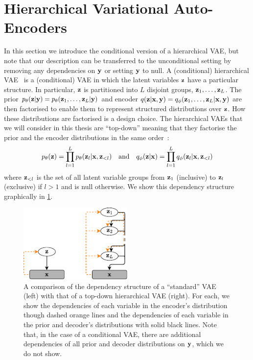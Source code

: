 \section{Hierarchical Variational Auto-Encoders} \label{sec:hierarchical-vae}
In this section we introduce the conditional version of a hierarchical VAE, but note that our description can be transferred to the unconditional setting by removing any dependencies on ${\mathbf{y}}$ or setting ${\mathbf{y}}$ to null. A (conditional) hierarchical VAE~\citep{gregor2015draw,kingma2016improving,sonderby2016ladder,klushyn2019learning} is a (conditional) VAE in which the latent variables ${\mathbf{z}}$ have a particular structure. In particular, ${\mathbf{z}}$ is partitioned into $L$ disjoint groups, ${\mathbf{z}}_1,\ldots,{\mathbf{z}}_L$. The prior $p_\theta({\mathbf{z}}|{\mathbf{y}}) = p_\theta({\mathbf{z}}_1,\ldots,{\mathbf{z}}_L|{\mathbf{y}})$ and encoder $q({\mathbf{z}}|{\mathbf{x}},{\mathbf{y}}) = q_\phi({\mathbf{z}}_1,\ldots,{\mathbf{z}}_L|{\mathbf{x}},{\mathbf{y}})$ are then factorised to enable them to represent structured distributions over ${\mathbf{z}}$. How these distributions are factorised is a design choice.
The hierarchical VAEs that we will consider in this thesis are ``top-down'' meaning that they factorise the prior and the encoder distributions in the same order~\citep{vahdat2020nvae,child2020very}:
\begin{equation}
    p_\theta({\mathbf{z}}) = \prod_{l=1}^L p_\theta({\mathbf{z}}_l|{\mathbf{x}},{\mathbf{z}}_{<l}) \quad \text{and} \quad q_\phi({\mathbf{z}}|{\mathbf{x}}) = \prod_{l=1}^L q_\phi({\mathbf{z}}_l|{\mathbf{x}},{\mathbf{z}}_{<l})
\end{equation}
where ${\mathbf{z}}_{<l}$ is the set of all latent variable groups from ${\mathbf{z}}_1$ (inclusive) to ${\mathbf{z}}_{l}$ (exclusive) if $l > 1$ and is null otherwise. We show this dependency structure graphically in \cref{fig:vae-vs-hierarchical-vae}.

\begin{figure}
    \centering
    \includegraphics[width=0.5\textwidth]{figs/thesis/vae-vs-hierarchical-vae.pdf}
    \caption{A comparison of the dependency structure of a ``standard'' VAE (left) with that of a top-down hierarchical VAE (right). For each, we show the dependencies of each variable in the encoder's distribution though dashed orange lines and the dependencies of each variable in the prior and decoder's distributions with solid black lines. Note that, in the case of a conditional VAE, there are additional dependencies of all prior and decoder distributions on ${\mathbf{y}}$, which we do not show.}
    \label{fig:vae-vs-hierarchical-vae}
\end{figure}

